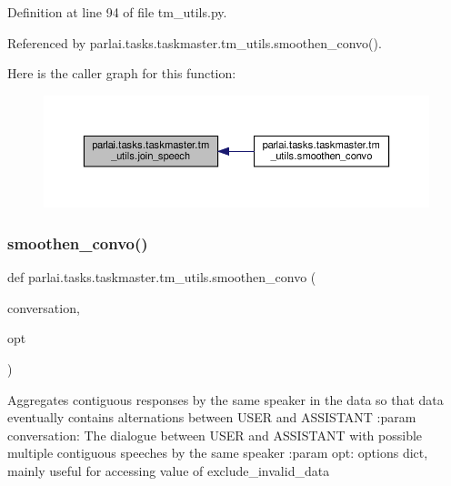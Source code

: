 Definition at line 94 of file tm\+\_\+utils.\+py.



Referenced by parlai.\+tasks.\+taskmaster.\+tm\+\_\+utils.\+smoothen\+\_\+convo().

Here is the caller graph for this function\+:
\nopagebreak
\begin{figure}[H]
\begin{center}
\leavevmode
\includegraphics[width=350pt]{namespaceparlai_1_1tasks_1_1taskmaster_1_1tm__utils_ad5d13cd462bd26919f078aa93174e9cd_icgraph}
\end{center}
\end{figure}
\mbox{\label{namespaceparlai_1_1tasks_1_1taskmaster_1_1tm__utils_ad9cc917cf497b3cd81ccb76a719cf1b7}} 
\subsubsection{\texorpdfstring{smoothen\+\_\+convo()}{smoothen\_convo()}}
{\footnotesize\ttfamily def parlai.\+tasks.\+taskmaster.\+tm\+\_\+utils.\+smoothen\+\_\+convo (\begin{DoxyParamCaption}\item[{}]{conversation,  }\item[{}]{opt }\end{DoxyParamCaption})}

\begin{DoxyVerb}Aggregates contiguous responses by the same speaker in the data so that data
eventually contains alternations between USER and ASSISTANT
:param conversation:
    The dialogue between USER and ASSISTANT with possible multiple contiguous
    speeches by the same speaker
:param opt:
    options dict, mainly useful for accessing value of exclude_invalid_data
\end{DoxyVerb}
 

